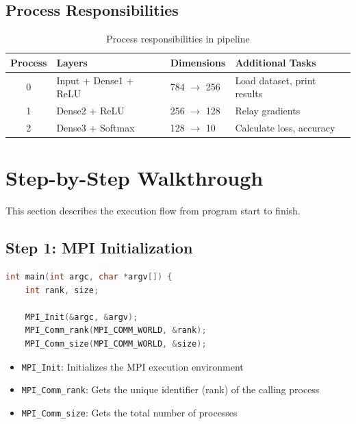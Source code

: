 \documentclass[11pt,a4paper]{article}
\begin{document}
\subsection{Process Responsibilities}

\begin{table}[h]
\centering
\begin{tabular}{@{}clll@{}}
\toprule
\textbf{Process} & \textbf{Layers} & \textbf{Dimensions} & \textbf{Additional Tasks} \\
\midrule
0 & Input + Dense1 + ReLU & 784 $\rightarrow$ 256 & Load dataset, print results \\
1 & Dense2 + ReLU & 256 $\rightarrow$ 128 & Relay gradients \\
2 & Dense3 + Softmax & 128 $\rightarrow$ 10 & Calculate loss, accuracy \\
\bottomrule
\end{tabular}
\caption{Process responsibilities in pipeline}
\end{table}

\section{Step-by-Step Walkthrough}

This section describes the execution flow from program start to finish.

\subsection{Step 1: MPI Initialization}

\begin{lstlisting}[language=C, caption={MPI initialization in main()}]
int main(int argc, char *argv[]) {
    int rank, size;

    MPI_Init(&argc, &argv);
    MPI_Comm_rank(MPI_COMM_WORLD, &rank);
    MPI_Comm_size(MPI_COMM_WORLD, &size);
\end{lstlisting}

\begin{itemize}
    \item \texttt{MPI\_Init}: Initializes the MPI execution environment
    \item \texttt{MPI\_Comm\_rank}: Gets the unique identifier (rank) of the calling process
    \item \texttt{MPI\_Comm\_size}: Gets the total number of processes
\end{itemize}
\end{document}
